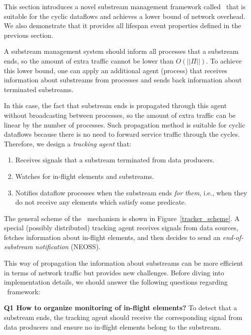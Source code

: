 \label{fs-acker-tracker}

This section introduces a novel substream management framework called \tracker\ that is suitable for the cyclic dataflows and achieves a lower bound of network overhead. We also demonstrate that it provides all lifespan event properties defined in the previous section.

A substream management system should inform all processes that a substream ends, so the amount of extra traffic cannot be lower than $O(||\Pi||)$. To achieve this lower bound, one can apply an additional agent (process) that receives information about substreams from processes and sends back information about terminated substreams. 

In this case, the fact that substream ends is propagated through this agent without broadcasting between processes, so the amount of extra traffic can be linear by the number of processes. Such propagation method is suitable for cyclic dataflows because there is no need to forward service traffic through the cycles. Therefore, we design a {\em tracking agent} that:

\begin{enumerate}
    \item Receives signals that a substream terminated from data producers.
    \item Watches for in-flight elements and substreams.
    \item Notifies dataflow processes when the substream ends {\em for them}, i.e., when they do not receive any elements which satisfy some predicate.
\end{enumerate}

The general scheme of the \tracker\ mechanism is shown in Figure~\ref{tracker_scheme}. A special (possibly distributed) tracking agent receives signals from data sources, fetches information about in-flight elements, and then decides to send an {\em end-of-substream notification} (NEOSS). 

This way of propagation the information about substreams can be more efficient in terms of network traffic but provides new challenges. Before diving into implementation details, we should answer the following questions regarding \tracker\ framework:

{\bf Q1 How to organize monitoring of in-flight elements?} To detect that a substream ends, the tracking agent should receive the corresponding signal from data producers and ensure no in-flight elements belong to the substream. 

